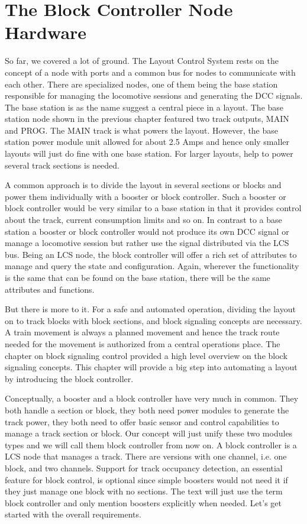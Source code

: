 \chapter{The Block Controller Node Hardware}

So far, we covered a lot of ground. The Layout Control System rests on the concept of a node with ports and a common bus for nodes to communicate with each other. There are specialized nodes, one of them being the base station responsible for managing the locomotive sessions and generating the DCC signals. The base station is as the name suggest a central piece in a layout. The base station node shown in the previous chapter featured two track outputs, MAIN and PROG. The MAIN track is what powers the layout. However, the base station power module unit allowed for about 2.5 Amps and hence only smaller layouts will just do fine with one base station. For larger layouts, help to power several track sections is needed.

A common approach is to divide the layout in several sections or blocks and power them individually with a booster or block controller. Such a booster or block controller would be very similar to a base station in that it provides control about the track, current consumption limits and so on. In contrast to a base station a booster or block controller would not produce its own DCC signal or manage a locomotive session but rather use the signal distributed via the LCS bus. Being an LCS node, the block controller will offer a rich set of attributes to manage and query the state and configuration. Again, wherever the functionality is the same that can be found on the base station, there will be the same attributes and functions.

But there is more to it. For a safe and automated operation, dividing the layout on to track blocks with block sections, and block signaling concepts are necessary. A train movement is always a planned movement and hence the track route needed for the movement is authorized from a central operations place. The chapter on block signaling control provided a high level overview on the block signaling concepts. This chapter will provide a big step into automating a layout by introducing the block controller.

Conceptually, a booster and a block controller have very much in common. They both handle a section or block, they both need power modules to generate the track power, they both need to offer basic sensor and control capabilities to manage a track section or block. Our concept will just unify these two modules types and we will call them block controller from now on. A block controller is a LCS node that manages a track. There are versions with one channel, i.e. one block, and two channels. Support for track occupancy detection, an essential feature for block control, is optional since simple boosters would not need it if they just manage one block with no sections. The text will just use the term block controller and only mention boosters explicitly when needed. Let's get started with the overall requirements.

